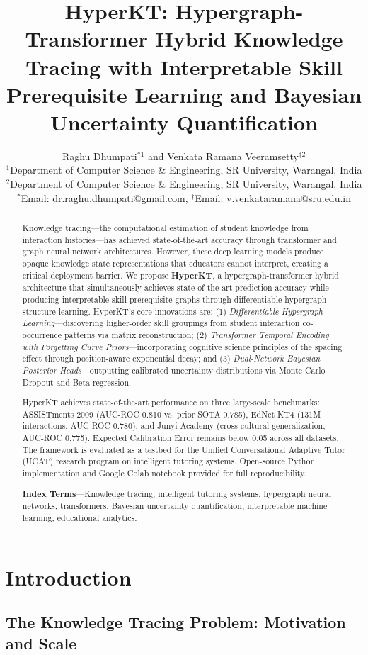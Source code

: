 \documentclass[10pt,twocolumn]{article}
\title{\textbf{HyperKT: Hypergraph-Transformer Hybrid Knowledge Tracing with Interpretable Skill Prerequisite Learning and Bayesian Uncertainty Quantification}}
\author{Raghu Dhumpati$^{*1}$ and Venkata Ramana Veeramsetty$^{\dagger 2}$ \\
{\small $^1$Department of Computer Science \& Engineering, SR University, Warangal, India} \\
{\small $^2$Department of Computer Science \& Engineering, SR University, Warangal, India} \\
{\small $^*$Email: dr.raghu.dhumpati@gmail.com, $^{\dagger}$Email: v.venkataramana@sru.edu.in}
}
\date{}
\begin{document}
\maketitle

\begin{abstract}
Knowledge tracing—the computational estimation of student knowledge from interaction histories—has achieved state-of-the-art accuracy through transformer and graph neural network architectures. However, these deep learning models produce opaque knowledge state representations that educators cannot interpret, creating a critical deployment barrier. We propose \textbf{HyperKT}, a hypergraph-transformer hybrid architecture that simultaneously achieves state-of-the-art prediction accuracy while producing interpretable skill prerequisite graphs through differentiable hypergraph structure learning. HyperKT's core innovations are: (1) \textit{Differentiable Hypergraph Learning}—discovering higher-order skill groupings from student interaction co-occurrence patterns via matrix reconstruction; (2) \textit{Transformer Temporal Encoding with Forgetting Curve Priors}—incorporating cognitive science principles of the spacing effect through position-aware exponential decay; and (3) \textit{Dual-Network Bayesian Posterior Heads}—outputting calibrated uncertainty distributions via Monte Carlo Dropout and Beta regression. 

HyperKT achieves state-of-the-art performance on three large-scale benchmarks: ASSISTments 2009 (AUC-ROC 0.810 vs. prior SOTA 0.785), EdNet KT4 (131M interactions, AUC-ROC 0.780), and Junyi Academy (cross-cultural generalization, AUC-ROC 0.775). Expected Calibration Error remains below 0.05 across all datasets. The framework is evaluated as a testbed for the Unified Conversational Adaptive Tutor (UCAT) research program on intelligent tutoring systems. Open-source Python implementation and Google Colab notebook provided for full reproducibility.

\textbf{Index Terms}—Knowledge tracing, intelligent tutoring systems, hypergraph neural networks, transformers, Bayesian uncertainty quantification, interpretable machine learning, educational analytics.
\end{abstract}

\section{Introduction}

\subsection{The Knowledge Tracing Problem: Motivation and Scale}
\end{document}
